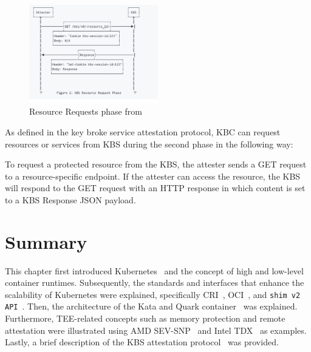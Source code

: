 \begin{figure}[!htb]
    \centering
    \includegraphics[width=0.5\textwidth]{images/resourcerequrie.PNG}
    \caption[Resource Requests phase]{Resource Requests phase from~\cite*{kbs_Attestation_protocol}}
    \label{fig:resourcerequrie}
\end{figure}
As defined in the key broke service attestation protocol, \acrshort{KBC} can request resources or services from KBS during the second phase in the following way:
\begin{displayquote}
  To request a protected resource from the KBS, the attester sends a GET request to a resource-specific endpoint. If the attester can access the resource, the KBS will respond to the GET request with an HTTP response in which content is set to a KBS Response JSON payload.
\end{displayquote}


\section{Summary}
This chapter first introduced Kubernetes~\cite*{k8s} and the concept of high and low-level container runtimes. Subsequently, the standards and interfaces that enhance the scalability of Kubernetes were explained, specifically CRI~\cite*{cri-interface}, OCI~\cite*{oci-runtime-spec}, and 
\texttt{shim v2 API}~\cite*{shim_v2}.
Then, the architecture of the Kata and Quark container~\cite*{Kata-Containers, quark} was explained. Furthermore, TEE-related concepts such as memory protection and remote attestation were illustrated using AMD SEV-SNP~\cite*{SEV_SNP_white_book} and Intel TDX~\cite*{Intel_tdx_whitepaper} as 
examples. Lastly, a brief description of the KBS attestation protocol~\cite*{kbs_Attestation_protocol} was provided.
\cleardoublepage

